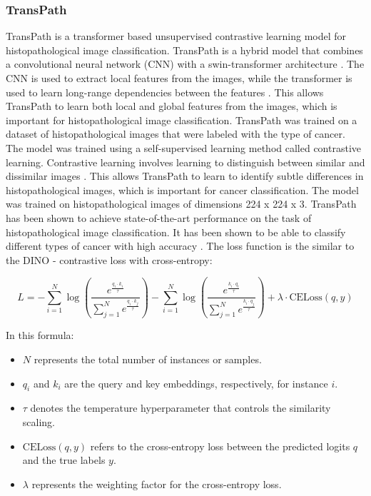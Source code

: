 \documentclass[12pt,a4paper]{article}
\begin{document}
\subsubsection{TransPath}
TransPath is a transformer based unsupervised contrastive learning model for histopathological image classification. TransPath is a hybrid model that combines a convolutional neural network (CNN) with a swin-transformer architecture \cite{WANG2022102559}. The CNN is used to extract local features from the images, while the transformer is used to learn long-range dependencies between the features \cite{WANG2022102559}. This allows TransPath to learn both local and global features from the images, which is important for histopathological image classification. TransPath was trained on a dataset of histopathological images that were labeled with the type of cancer. The model was trained using a self-supervised learning method called contrastive learning. Contrastive learning involves learning to distinguish between similar and dissimilar images \cite{WANG2022102559}. This allows TransPath to learn to identify subtle differences in histopathological images, which is important for cancer classification. The model was trained on histopathological images of dimensions 224 x 224 x 3. TransPath has been shown to achieve state-of-the-art performance on the task of histopathological image classification. It has been shown to be able to classify different types of cancer with high accuracy \cite{WANG2022102559}. The loss function is the similar to the DINO - contrastive loss with cross-entropy:

\[
L = -\sum_{i=1}^{N} \log \left( \frac{e^{\frac{q_{i} \cdot k_{i}}{\tau}}}{\sum_{j=1}^{N} e^{\frac{q_{i} \cdot k_{j}}{\tau}}} \right) - \sum_{i=1}^{N} \log \left( \frac{e^{\frac{k_{i} \cdot q_{i}}{\tau}}}{\sum_{j=1}^{N} e^{\frac{k_{i} \cdot q_{j}}{\tau}}} \right) + \lambda \cdot \mathrm{CELoss}(q, y)
\]

In this formula:
\begin{itemize}
\item \(N\) represents the total number of instances or samples.
\item \(q_i\) and \(k_i\) are the query and key embeddings, respectively, for instance \(i\).
\item \(\tau\) denotes the temperature hyperparameter that controls the similarity scaling.
\item \(\text{CELoss}(q, y)\) refers to the cross-entropy loss between the predicted logits \(q\) and the true labels \(y\).
\item \(\lambda\) represents the weighting factor for the cross-entropy loss.
\end{itemize}
\end{document}
